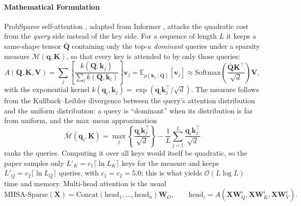 \paragraph{Mathematical Formulation}

ProbSparse self-attention \citep{wu_deep_sparse_conformer_2022}, adapted from Informer \citep{zhou_informer_2021}, attacks the quadratic cost from the \emph{query} side instead of the key side. For a sequence of length $L$ it keeps a same-shape tensor $\bar{\mathbf{Q}}$ containing only the top-$u$ \emph{dominant} queries under a sparsity measure $\mathcal{M}(\mathbf{q}, \mathbf{K})$, so that every key is attended to by only those queries:
\begin{equation}
A(\mathbf{Q},\mathbf{K},\mathbf{V}) = \sum_j \left[\frac{k(\mathbf{Q},\mathbf{k}_j)}{\sum_l k(\mathbf{Q},\mathbf{k}_l)}\right]\mathbf{v}_j
= \mathbb{E}_{p(\mathbf{k}_j\mid\mathbf{Q})}[\mathbf{v}_j]
\approx \mathrm{Softmax}\!\left(\frac{\bar{\mathbf{Q}}\mathbf{K}^{\top}}{\sqrt{d}}\right)\mathbf{V},
\end{equation}
with the exponential kernel $k(\mathbf{q}_i,\mathbf{k}_j)=\exp(\mathbf{q}_i\mathbf{k}_j^{\top}/\sqrt{d})$. The measure follows from the Kullback--Leibler divergence between the query's attention distribution and the uniform distribution: a query is ``dominant'' when its distribution is far from uniform, and the max--mean approximation
\begin{equation}
\bar{\mathcal{M}}(\mathbf{q}_i,\mathbf{K}) = \max_j\left\{\frac{\mathbf{q}_i\mathbf{k}_j^{\top}}{\sqrt{d}}\right\} - \frac{1}{L}\sum_{j=1}^{L}\frac{\mathbf{q}_i\mathbf{k}_j^{\top}}{\sqrt{d}}
\end{equation}
ranks the queries. Computing it over all keys would itself be quadratic, so the paper samples only $L'_K = c_1\lceil\ln L_K\rceil$ keys for the measure and keeps $L'_Q = c_2\lceil\ln L_Q\rceil$ queries, with $c_1=c_2=5.0$; this is what yields $\mathcal{O}(L\log L)$ time and memory. Multi-head attention is the usual
\begin{equation}
\mathrm{MHSA\text{-}Sparse}(\mathbf{X}) = \mathrm{Concat}(\mathrm{head}_1,\dots,\mathrm{head}_h)\mathbf{W}_O,
\qquad
\mathrm{head}_i = A(\mathbf{X}\mathbf{W}_Q^i,\mathbf{X}\mathbf{W}_K^i,\mathbf{X}\mathbf{W}_V^i).
\end{equation}

